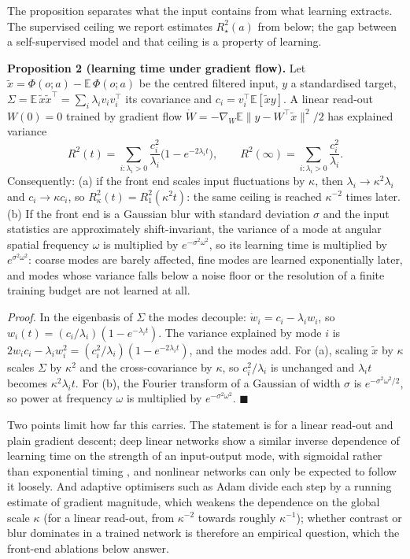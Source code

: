 \documentclass{article}
\begin{document}
The proposition separates what the input contains from what learning extracts. The supervised ceiling we report estimates \(R^2_\star(a)\) from below; the gap between a self-supervised model and that ceiling is a property of learning.

\textbf{Proposition 2 (learning time under gradient flow).} Let \(\tilde x=\Phi(o;a)-\mathbb E\,\Phi(o;a)\) be the centred filtered input, \(y\) a standardised target, \(\Sigma=\mathbb E\,\tilde x\tilde x^\top=\sum_i\lambda_i v_iv_i^\top\) its covariance and \(c_i=v_i^\top\mathbb E[\tilde x y]\). A linear read-out \(W(0)=0\) trained by gradient flow \(\dot W=-\nabla_W\mathbb E\lVert y-W^\top\tilde x\rVert^2/2\) has explained variance
\begin{equation}R^2(t)=\sum_{i:\lambda_i>0}\frac{c_i^2}{\lambda_i}\Big(1-e^{-2\lambda_i t}\Big),\qquad R^2(\infty)=\sum_{i:\lambda_i>0}\frac{c_i^2}{\lambda_i}.\end{equation}
Consequently: (a) if the front end scales input fluctuations by \(\kappa\), then \(\lambda_i\to\kappa^2\lambda_i\) and \(c_i\to\kappa c_i\), so \(R^2_\kappa(t)=R^2_1(\kappa^2t)\): the same ceiling is reached \(\kappa^{-2}\) times later. (b) If the front end is a Gaussian blur with standard deviation \(\sigma\) and the input statistics are approximately shift-invariant, the variance of a mode at angular spatial frequency \(\omega\) is multiplied by \(e^{-\sigma^2\omega^2}\), so its learning time is multiplied by \(e^{\sigma^2\omega^2}\): coarse modes are barely affected, fine modes are learned exponentially later, and modes whose variance falls below a noise floor or the resolution of a finite training budget are not learned at all.

\emph{Proof.} In the eigenbasis of \(\Sigma\) the modes decouple: \(\dot w_i=c_i-\lambda_iw_i\), so \(w_i(t)=(c_i/\lambda_i)(1-e^{-\lambda_it})\). The variance explained by mode \(i\) is \(2w_ic_i-\lambda_iw_i^2=(c_i^2/\lambda_i)(1-e^{-2\lambda_it})\), and the modes add. For (a), scaling \(\tilde x\) by \(\kappa\) scales \(\Sigma\) by \(\kappa^2\) and the cross-covariance by \(\kappa\), so \(c_i^2/\lambda_i\) is unchanged and \(\lambda_it\) becomes \(\kappa^2\lambda_it\). For (b), the Fourier transform of a Gaussian of width \(\sigma\) is \(e^{-\sigma^2\omega^2/2}\), so power at frequency \(\omega\) is multiplied by \(e^{-\sigma^2\omega^2}\). \(\blacksquare\)

Two points limit how far this carries. The statement is for a linear read-out and plain gradient descent; deep linear networks show a similar inverse dependence of learning time on the strength of an input-output mode, with sigmoidal rather than exponential timing \autocite{saxe2019mathematical}, and nonlinear networks can only be expected to follow it loosely. And adaptive optimisers such as Adam divide each step by a running estimate of gradient magnitude, which weakens the dependence on the global scale \(\kappa\) (for a linear read-out, from \(\kappa^{-2}\) towards roughly \(\kappa^{-1}\)); whether contrast or blur dominates in a trained network is therefore an empirical question, which the front-end ablations below answer.
\end{document}
